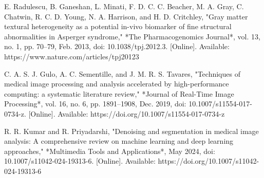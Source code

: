 \begin{thebibliography}{00}
	E. Radulescu, B. Ganeshan, L. Minati, F. D. C. C. Beacher, M. A. Gray, C. Chatwin, R. C. D. Young, N. A. Harrison, and H. D. Critchley, "Gray matter textural heterogeneity as a potential in-vivo biomarker of fine structural abnormalities in Asperger syndrome," *The Pharmacogenomics Journal*, vol. 13, no. 1, pp. 70–79, Feb. 2013, doi: 10.1038/tpj.2012.3. [Online]. Available: https://www.nature.com/articles/tpj20123
	
	C. A. S. J. Gulo, A. C. Sementille, and J. M. R. S. Tavares, "Techniques of medical image processing and analysis accelerated by high-performance computing: a systematic literature review," *Journal of Real-Time Image Processing*, vol. 16, no. 6, pp. 1891–1908, Dec. 2019, doi: 10.1007/s11554-017-0734-z. [Online]. Available: https://doi.org/10.1007/s11554-017-0734-z
	
	R. R. Kumar and R. Priyadarshi, "Denoising and segmentation in medical image analysis: A comprehensive review on machine learning and deep learning approaches," *Multimedia Tools and Applications*, May 2024, doi: 10.1007/s11042-024-19313-6. [Online]. Available: https://doi.org/10.1007/s11042-024-19313-6
	

\end{thebibliography}





